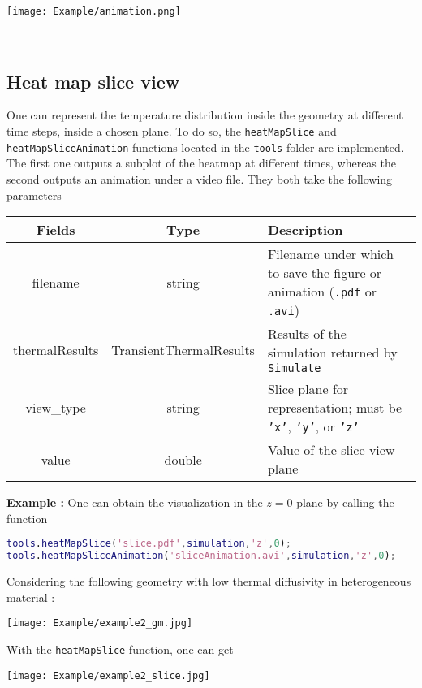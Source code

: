 \begin{center}
\texttt{[image: Example/animation.png]}
\end{center}
\ 


\newpage

\subsection{Heat map slice view}

One can represent the temperature distribution inside the geometry at different time steps, inside a chosen plane. To do so, the {\tt heatMapSlice} and {\tt heatMapSliceAnimation} functions located in the {\tt tools} folder are implemented. The first one outputs a subplot of the heatmap at different times, whereas the second outputs an animation under a video file. They both take the following parameters 

\renewcommand{\arraystretch}{1.5}
\begin{table}[h]
    \centering
    \begin{tabular}{|>{\ttfamily}c|>{\ttfamily}c|>{\raggedright\arraybackslash}p{8cm}|}
        \hline 
        \rowcolor{gray!30}
        \textbf{Fields} & \textbf{Type} & \textbf{Description} \\ \hline
        filename & string & Filename under which to save the figure or animation (\texttt{.pdf} or \texttt{.avi}) \\ \hline
        thermalResults & TransientThermalResults & Results of the simulation returned by \texttt{Simulate} \\ \hline 
        view\_type & string & Slice plane for representation; must be \texttt{'x'}, \texttt{'y'}, or \texttt{'z'} \\ \hline 
        value & double & Value of the slice view plane \\ \hline 
    \end{tabular}
\end{table}

\medskip

\textbf{Example :} One can obtain the visualization in the $z=0$ plane by calling the function

\begin{lstlisting}[language=Matlab]
tools.heatMapSlice('slice.pdf',simulation,'z',0);
tools.heatMapSliceAnimation('sliceAnimation.avi',simulation,'z',0);
\end{lstlisting}

\medskip
Considering the following geometry with low thermal diffusivity in heterogeneous material :

\begin{center}
\texttt{[image: Example/example2\_gm.jpg]}
\end{center}

With the {\tt heatMapSlice} function, one can get 
\begin{center}
\texttt{[image: Example/example2\_slice.jpg]}
\end{center}